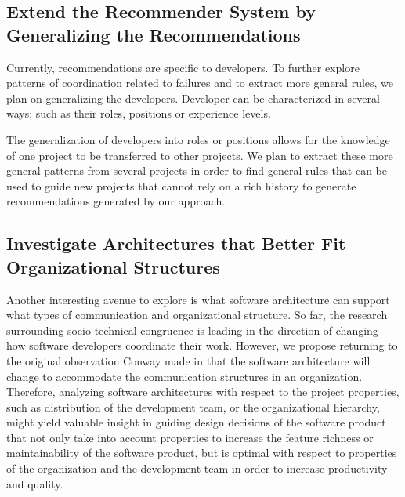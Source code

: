 \subsection{Extend the Recommender System by Generalizing the Recommendations}
Currently, recommendations are specific to developers.
To further explore patterns of coordination related to failures and to extract more general rules, we plan on generalizing the developers.
Developer can be characterized in several ways; such as their roles, positions or experience levels.

The generalization of developers into roles or positions allows for the knowledge of one project to be transferred to other projects.
We plan to extract these more general patterns from several projects in order to find general rules that can be used to guide new projects that cannot rely on a rich history to generate recommendations generated by our approach.

\subsection{Investigate Architectures that Better Fit Organizational Structures}
Another interesting avenue to explore is what software architecture can support what types of communication and organizational structure.
So far, the research surrounding socio-technical congruence is leading in the direction of changing how software developers coordinate their work.
However, we propose returning to the original observation Conway made in that the software architecture will change to accommodate the communication structures in an organization.
Therefore, analyzing software architectures with respect to the project properties, such as distribution of the development team, or the organizational hierarchy, might yield valuable insight in guiding design decisions of the software product that not only take into account properties to increase the feature richness or maintainability of the software product, but is optimal with respect to properties of the organization and the development team in order to increase productivity and quality. 
